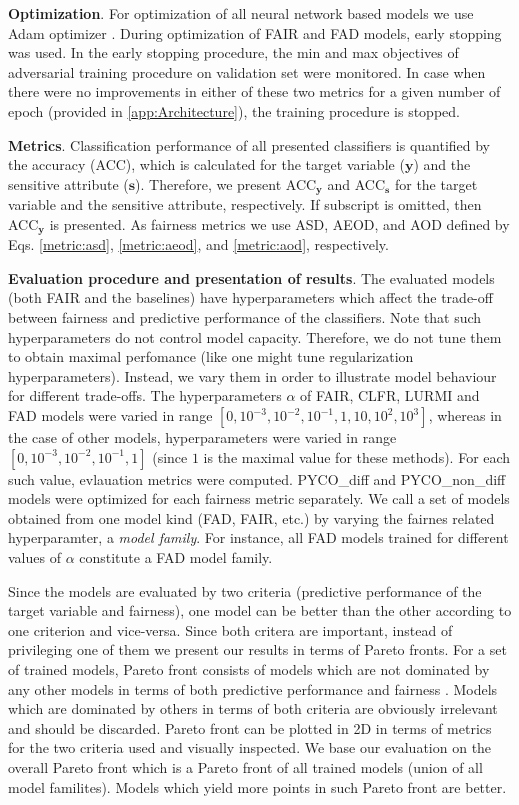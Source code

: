 \documentclass[preprint,12pt]{elsarticle}
\begin{document}
\textbf{Optimization}.
For optimization of all neural network based models we use Adam optimizer \cite{bock2019proof}.
During optimization of FAIR and FAD models, early stopping was used. In the early stopping procedure, the min and max objectives of adversarial training procedure on validation set were monitored. In case when there were no improvements in either of these two metrics for a given number of epoch (provided in \ref{app:Architecture}), the training procedure is stopped.

\textbf{Metrics}.
Classification performance of all presented classifiers is quantified by the accuracy (ACC), which is calculated for the target variable ($\mathbf{y}$) and the sensitive attribute ($\mathbf{s}$). Therefore, we present ACC$_\mathbf{y}$ and ACC$_\mathbf{s}$ for the target variable and the sensitive attribute, respectively. If subscript is omitted, then ACC$_\mathbf{y}$ is presented. As fairness metrics we use ASD, AEOD, and AOD defined by Eqs. \ref{metric:asd}, \ref{metric:aeod}, and \ref{metric:aod}, respectively. 

\textbf{Evaluation procedure and presentation of results}. The evaluated models (both FAIR and the baselines) have hyperparameters which affect the trade-off between fairness and predictive performance of the classifiers. Note that such hyperparameters do not control model capacity. Therefore, we do not tune them to obtain maximal perfomance (like one might tune regularization hyperparameters). Instead, we vary them in order to illustrate model behaviour for different trade-offs. The hyperparameters $\alpha$ of FAIR, CLFR, LURMI and FAD models were varied in range $[0, 10^{-3}, 10^{-2}, 10^{-1}, 1, 10, 10^{2}, 10^{3}]$, whereas in the case of other models, hyperparameters were varied in range $[0, 10^{-3}, 10^{-2}, 10^{-1}, 1]$ (since $1$ is the maximal value for these methods). For each such value, evlauation metrics were computed. PYCO\_diff and PYCO\_non\_diff models were optimized for each fairness metric separately. We call a set of models obtained from one model kind (FAD, FAIR, etc.) by varying the fairnes related hyperparamter, a {\em model family}. For instance, all FAD models trained for different values of $\alpha$ constitute a FAD model family.

Since the models are evaluated by two criteria (predictive performance of the target variable and fairness), one model can be better than the other according to one criterion and vice-versa. Since both critera are important, instead of privileging one of them we present our results in terms of Pareto fronts. For a set of trained models, Pareto front consists of models which are not dominated by any other models in terms of both predictive performance and fairness \cite{marler2004survey}. Models which are dominated by others in terms of both criteria are obviously irrelevant and should be discarded. Pareto front can be plotted in 2D in terms of metrics for the two criteria used and visually inspected. We base our evaluation on the overall Pareto front which is a Pareto front of all trained models (union of all model familites). Models which yield more points in such Pareto front are better.
\end{document}
